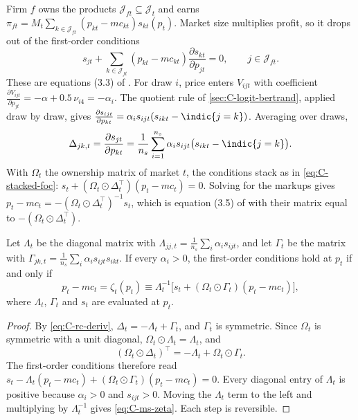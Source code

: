 Firm $f$ owns the products $\mathcal{J}_{ft} \subseteq \mathcal{J}_t$ and earns
$\pi_{ft} = M_t\sum_{k \in \mathcal{J}_{ft}}(p_{kt} - mc_{kt})s_{kt}(p_t)$. Market size multiplies profit, so it drops out of
the first-order conditions
\begin{equation}\label{eq:C-rc-foc}
  s_{jt} + \sum_{k \in \mathcal{J}_{ft}}(p_{kt} - mc_{kt})\frac{\partial s_{kt}}{\partial p_{jt}} = 0 , \qquad j \in \mathcal{J}_{ft} .
\end{equation}
These are equations (3.3) of \citet[p.~853]{BerryLevinsohnPakes1995}. For draw $i$, price enters $V_{ijt}$ with
coefficient $\frac{\partial V_{ijt}}{\partial p_{jt}} = -\alpha + 0.5\,\nu_{i4} = -\alpha_i$. The quotient rule of
\cref{sec:C-logit-bertrand}, applied draw by draw, gives
$\frac{\partial s_{ijt}}{\partial p_{kt}} = \alpha_is_{ijt}(s_{ikt} - \indic\{j = k\})$. Averaging over draws,
\begin{equation}\label{eq:C-rc-deriv}
  \Delta_{jk,t} = \frac{\partial s_{jt}}{\partial p_{kt}} = \frac{1}{n_s}\sum_{i=1}^{n_s}\alpha_is_{ijt}\big(s_{ikt} - \indic\{j = k\}\big) .
\end{equation}
With $\Omega_t$ the ownership matrix of market $t$, the conditions stack as in \eqref{eq:C-stacked-foc}:
$s_t + (\Omega_t \odot \Delta_t^\top)(p_t - mc_t) = 0$. Solving for the markups gives
$p_t - mc_t = -(\Omega_t \odot \Delta_t^\top)^{-1}s_t$, which is equation (3.5) of
\citet[p.~854]{BerryLevinsohnPakes1995} with their matrix equal to $-(\Omega_t \odot \Delta_t^\top)$.

\begin{proposition}\label{prop:C-ms}
Let $\Lambda_t$ be the diagonal matrix with $\Lambda_{jj,t} = \frac{1}{n_s}\sum_i\alpha_is_{ijt}$, and let $\Gamma_t$ be
the matrix with $\Gamma_{jk,t} = \frac{1}{n_s}\sum_i\alpha_is_{ijt}s_{ikt}$. If every $\alpha_i > 0$, the first-order
conditions hold at $p_t$ if and only if
\begin{equation}\label{eq:C-ms-zeta}
  p_t - mc_t = \zeta_t(p_t) \equiv \Lambda_t^{-1}\big[s_t + (\Omega_t \odot \Gamma_t)(p_t - mc_t)\big] ,
\end{equation}
where $\Lambda_t$, $\Gamma_t$ and $s_t$ are evaluated at $p_t$.
\end{proposition}

\begin{proof}
By \eqref{eq:C-rc-deriv}, $\Delta_t = -\Lambda_t + \Gamma_t$, and $\Gamma_t$ is symmetric. Since $\Omega_t$ is symmetric
with a unit diagonal, $\Omega_t \odot \Lambda_t = \Lambda_t$, and
\begin{equation*}
  (\Omega_t \odot \Delta_t)^\top = -\Lambda_t + \Omega_t \odot \Gamma_t .
\end{equation*}
The first-order conditions therefore read $s_t - \Lambda_t(p_t - mc_t) + (\Omega_t \odot \Gamma_t)(p_t - mc_t) = 0$.
Every diagonal entry of $\Lambda_t$ is positive because $\alpha_i > 0$ and $s_{ijt} > 0$. Moving the $\Lambda_t$ term
to the left and multiplying by $\Lambda_t^{-1}$ gives \eqref{eq:C-ms-zeta}. Each step is reversible.
\end{proof}

